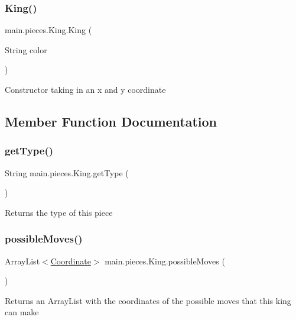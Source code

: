 \subsubsection{\texorpdfstring{King()}{King()}}
{\footnotesize\ttfamily main.\+pieces.\+King.\+King (\begin{DoxyParamCaption}\item[{String}]{color }\end{DoxyParamCaption})}

Constructor taking in an x and y coordinate 

\subsection{Member Function Documentation}
\hypertarget{classmain_1_1pieces_1_1_king_a357799158a941db860a25da4d0b9ec5a}{}\label{classmain_1_1pieces_1_1_king_a357799158a941db860a25da4d0b9ec5a} 
\subsubsection{\texorpdfstring{get\+Type()}{getType()}}
{\footnotesize\ttfamily String main.\+pieces.\+King.\+get\+Type (\begin{DoxyParamCaption}{ }\end{DoxyParamCaption})}

Returns the type of this piece \hypertarget{classmain_1_1pieces_1_1_king_afde71e97df359b784be2db1a66ac36b1}{}\label{classmain_1_1pieces_1_1_king_afde71e97df359b784be2db1a66ac36b1} 
\subsubsection{\texorpdfstring{possible\+Moves()}{possibleMoves()}}
{\footnotesize\ttfamily Array\+List$<$\hyperlink{classmain_1_1model_1_1_coordinate}{Coordinate}$>$ main.\+pieces.\+King.\+possible\+Moves (\begin{DoxyParamCaption}{ }\end{DoxyParamCaption})}

Returns an Array\+List with the coordinates of the possible moves that this king can make \hypertarget{classmain_1_1pieces_1_1_king_aa93a1ae4998482975674eeca33112961}{}\label{classmain_1_1pieces_1_1_king_aa93a1ae4998482975674eeca33112961} 
